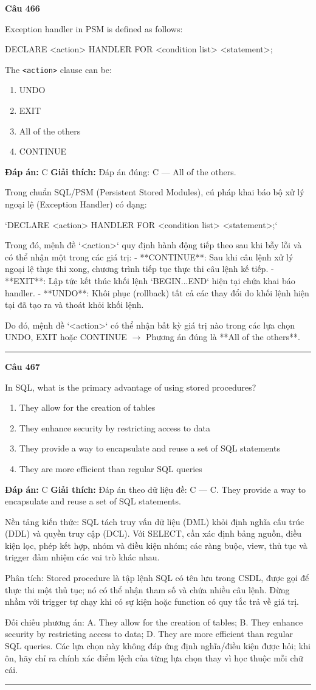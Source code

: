 \documentclass[11pt,a4paper]{article}
\newenvironment{question}[1]{%
  \par\vspace{1em}\noindent\textbf{\large Câu #1}\par\vspace{0.4em}
}{%
  \par\vspace{1em}\hrule\vspace{0.6em}
}
\newenvironment{choices}{%
  \begin{enumerate}[label=\textbf{\Alph*.},leftmargin=2.2em,itemsep=2pt,topsep=3pt]
}{%
  \end{enumerate}
}
\newcommand{\choice}{\item}
\newenvironment{codebox}{%
  \begin{tcolorbox}[colback=gray!8!white,colframe=gray!50!black,arc=1.5mm,boxrule=0.6pt,left=3mm,right=3mm,top=2.5mm,bottom=2.5mm]
  \ttfamily\small
}{%
  \end{tcolorbox}
}
\begin{document}
\begin{question}{466}
Exception handler in PSM is defined as follows:
\begin{codebox}
DECLARE <action> HANDLER FOR <condition list> <statement>;
\end{codebox}
The \texttt{<action>} clause can be:
\begin{choices}
\choice UNDO
\choice EXIT
\choice All of the others
\choice CONTINUE
\end{choices}
\textbf{Đáp án:} C
\textbf{Giải thích:} Đáp án đúng: C — All of the others.

Trong chuẩn SQL/PSM (Persistent Stored Modules), cú pháp khai báo bộ xử lý ngoại lệ (Exception Handler) có dạng:

`DECLARE <action> HANDLER FOR <condition list> <statement>;`

Trong đó, mệnh đề `<action>` quy định hành động tiếp theo sau khi bẫy lỗi và có thể nhận một trong các giá trị:
- **CONTINUE**: Sau khi câu lệnh xử lý ngoại lệ thực thi xong, chương trình tiếp tục thực thi câu lệnh kế tiếp.
- **EXIT**: Lập tức kết thúc khối lệnh `BEGIN...END` hiện tại chứa khai báo handler.
- **UNDO**: Khôi phục (rollback) tất cả các thay đổi do khối lệnh hiện tại đã tạo ra và thoát khỏi khối lệnh.

Do đó, mệnh đề `<action>` có thể nhận bất kỳ giá trị nào trong các lựa chọn UNDO, EXIT hoặc CONTINUE $\to$ Phương án đúng là **All of the others**.
\end{question}

\begin{question}{467}
In SQL, what is the primary advantage of using stored procedures?
\begin{choices}
\choice They allow for the creation of tables
\choice They enhance security by restricting access to data
\choice They provide a way to encapsulate and reuse a set of SQL statements
\choice They are more efficient than regular SQL queries
\end{choices}
\textbf{Đáp án:} C
\textbf{Giải thích:} Đáp án theo dữ liệu đề: C — C. They provide a way to encapsulate and reuse a set of SQL statements.

Nền tảng kiến thức: SQL tách truy vấn dữ liệu (DML) khỏi định nghĩa cấu trúc (DDL) và quyền truy cập (DCL). Với SELECT, cần xác định bảng nguồn, điều kiện lọc, phép kết hợp, nhóm và điều kiện nhóm; các ràng buộc, view, thủ tục và trigger đảm nhiệm các vai trò khác nhau.

Phân tích: Stored procedure là tập lệnh SQL có tên lưu trong CSDL, được gọi để thực thi một thủ tục; nó có thể nhận tham số và chứa nhiều câu lệnh. Đừng nhầm với trigger tự chạy khi có sự kiện hoặc function có quy tắc trả về giá trị.

Đối chiếu phương án: A. They allow for the creation of tables; B. They enhance security by restricting access to data; D. They are more efficient than regular SQL queries. Các lựa chọn này không đáp ứng định nghĩa/điều kiện được hỏi; khi ôn, hãy chỉ ra chính xác điểm lệch của từng lựa chọn thay vì học thuộc mỗi chữ cái.
\end{question}
\end{document}
